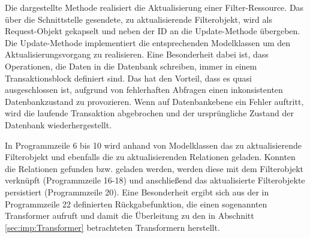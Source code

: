 \begin{program}[H]
\label{prog:controller}
\end{program}

Die dargestellte Methode realisiert die Aktualisierung einer Filter-Ressource. Das über die Schnittstelle gesendete, zu aktualisierende Filterobjekt, wird als Request-Objekt gekapselt und neben der ID an die Update-Methode übergeben. Die Update-Methode implementiert die entsprechenden Modelklassen um den Aktualisierungsvorgang zu realisieren. Eine Besonderheit dabei ist, dass Operationen, die Daten in die Datenbank schreiben, immer in einem Transaktionsblock definiert sind. Das hat den Vorteil, dass es quasi ausgeschlossen ist, aufgrund von fehlerhaften Abfragen einen inkonsistenten Datenbankzustand zu provozieren. Wenn auf Datenbankebene ein Fehler auftritt, wird die laufende Transaktion abgebrochen und der ursprüngliche Zustand der Datenbank wiederhergestellt.

In Programmzeile 6 bis 10 wird anhand von Modelklassen das zu aktualisierende Filterobjekt und ebenfalls die zu aktualisierenden Relationen geladen. Konnten die Relationen gefunden bzw. geladen werden, werden diese mit dem Filterobjekt verknüpft (Programmzeile 16-18) und anschließend das aktualisierte Filterobjekte persistiert (Programmzeile 20). Eine Besonderheit ergibt sich aus der in Programmzeile 22 definierten Rückgabefunktion, die einen sogenannten Transformer aufruft und damit die Überleitung zu den in Abschnitt \ref{sec:imp:Transformer} betrachteten Transformern herstellt.

